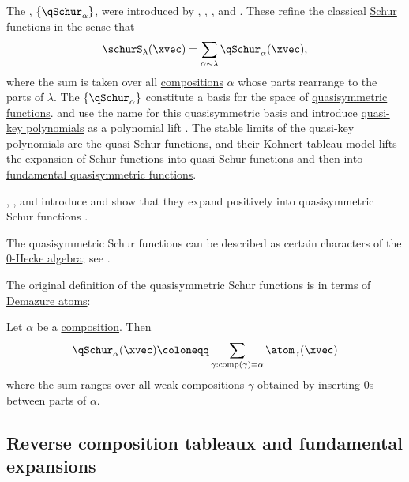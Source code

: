 The \label{quasisymmetricSchurFunction},
$\{\qSchur_\alpha \}$, were
introduced by , , ,
and 
\cite{HaglundLuotoMasonWilligenburg2011}.
These refine the classical \hyperref[schurS]{Schur functions} in the sense that
\[
 \schurS_\lambda(\xvec) = \sum_{\alpha \sim \lambda} \qSchur_\alpha(\xvec),
\]
where the sum is taken over all \hyperref[weakCompositions]{compositions}
$\alpha$ whose parts rearrange to the parts of $\lambda$.
The $\{\qSchur_\alpha \}$ constitute a basis for the
space of \hyperref[quasiSymmetricFunctions]{quasisymmetric functions}.
 and  use the name
\label{quasiSchurFunctions} for this
quasisymmetric basis and introduce \hyperref[quasiKey]{quasi-key polynomials}
as a polynomial lift \cite{AssafSearles2018}.  The
stable limits of the quasi-key polynomials are the quasi-Schur functions, and
their \hyperref[kohnertTableaux]{Kohnert-tableau} model lifts the expansion
of Schur functions into
quasi-Schur functions and then into
\hyperref[gessel]{fundamental quasisymmetric functions}.

, , and
 introduce
\label{skewQuasisymmetricSchurFunctions} and show that they expand positively
into quasisymmetric Schur functions \cite{BessenrodtLuotoWilligenburg2011}.

The quasisymmetric Schur functions can be described as certain characters of
the \hyperref[zeroHeckeAlgebra]{0-Hecke algebra}; see
\cite{TewariWilligenburg2015}.


The original definition of the quasisymmetric Schur
functions is in terms of \hyperref[atom]{Demazure atoms}:
\begin{definition}
Let $\alpha$ be a \hyperref[weakCompositions]{composition}. Then
\[
\qSchur_\alpha(\xvec)
\coloneqq
\sum_{\gamma : \mathrm{comp}(\gamma)=\alpha} \atom_{\gamma}(\xvec)
\]
where the sum ranges over all \hyperref[weakCompositions]{weak compositions}
$\gamma$ obtained by inserting $0$s between parts of $\alpha$.
\end{definition}



\subsection[quasisymmetricSchurTableaux]{Reverse composition tableaux and fundamental expansions}

